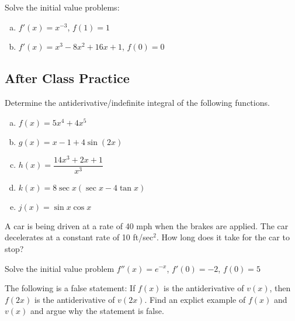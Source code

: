 \documentclass[notes]{subfiles}
\begin{document}
		\begin{ex}
			Solve the initial value problems:
			\begin{enumerate}[(a)]
				\item \(f'(x) = x^{-3}\), \(f(1) =1 \)
					
				\item \(f'(x) = x^3-8x^2 + 16x + 1\),  \(f(0) = 0\)
			\end{enumerate}
		\end{ex}
			\newpage
			
	\subsection*{After Class Practice}
		\begin{ex}
			Determine the antiderivative/indefinite integral of the following functions.
			\begin{enumerate}[(a)]
				\item \(f(x) = 5x^4 + 4x^5\)
					\vs{1}
					
				\item \(g(x) = x-1+4\sin(2x)\)
					\vs{1}
					
				\item \(h(x) = \dfrac{14x^3+2x+1}{x^3}\)
					\vs{1}
					
				\item \(k(x) = 8\sec x(\sec x -4\tan x)\)
					\vs{1}
					
				\item \(j(x) = \sin x\cos x\)
					\vs{1}
			\end{enumerate}
		\end{ex}
			\newpage
			
		\begin{ex}
			A car is being driven at a rate of 40 mph when the brakes are applied. The car decelerates at a constant rate of 10 ft/sec\(^2\). How long does it take for the car to stop?
		\end{ex}	
			
		\begin{ex}
			Solve the initial value problem \(f''(x) = e^{-x}\), \(f'(0) = -2\), \(f(0) = 5\)
		\end{ex}
			
		\begin{ex}
			The following is a false statement: If \(f(x)\) is the antiderivative of \(v(x)\), then \(f(2x)\) is the antiderivative of \(v(2x)\). Find an explict example of \(f(x)\) and \(v(x)\) and argue why the statement is false.
		\end{ex}
			
		
			
		
\clearpage
\end{document}
